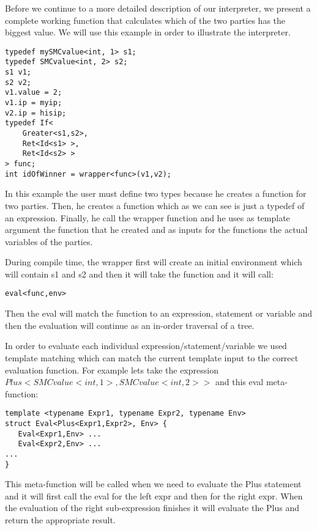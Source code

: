 \documentclass[paper=a4, fontsize=11pt]{scrartcl} %
\numberwithin{equation}{section} %
\numberwithin{figure}{section} %
\numberwithin{table}{section} %
\begin{document}
Before we continue to a more detailed description of our interpreter, we present a complete working function that calculates which of the two parties has the biggest value. We will use this example in order to illustrate the interpreter.
\begin{lstlisting}
typedef mySMCvalue<int, 1> s1;
typedef SMCvalue<int, 2> s2;
s1 v1;
s2 v2;
v1.value = 2;
v1.ip = myip;
v2.ip = hisip;
typedef If<
    Greater<s1,s2>,
    Ret<Id<s1> >,
    Ret<Id<s2> >
> func;
int idOfWinner = wrapper<func>(v1,v2);
\end{lstlisting}
In this example the user must define two types because he creates a function for two parties. Then, he creates a function which as we can see is just a typedef of an expression. Finally, he call the wrapper function and he uses as template argument the function that he created and as inputs for the functions the actual variables of the parties.

During compile time, the wrapper first will create an initial environment which will contain s1 and s2 and then it will take the function and it will call:
\begin{lstlisting}
eval<func,env>
\end{lstlisting}
Then the eval will match the function to an expression, statement or variable and then the evaluation will continue as an in-order traversal of a tree.

In order to evaluate each individual expression/statement/variable we used template matching which can match the current template input to the correct evaluation function. For example lets take the expression $Plus<SMCvalue<int,1>, SMCvalue<int,2> >$ and this eval meta-function:
\begin{lstlisting}
template <typename Expr1, typename Expr2, typename Env>
struct Eval<Plus<Expr1,Expr2>, Env> {
   Eval<Expr1,Env> ...
   Eval<Expr2,Env> ...
...
}
\end{lstlisting}
This meta-function will be called when we need to evaluate the Plus statement and it will first call the eval for the left expr and then for the right expr. When the evaluation of the right sub-expression finishes it will evaluate the Plus and return the appropriate result.
\end{document}
